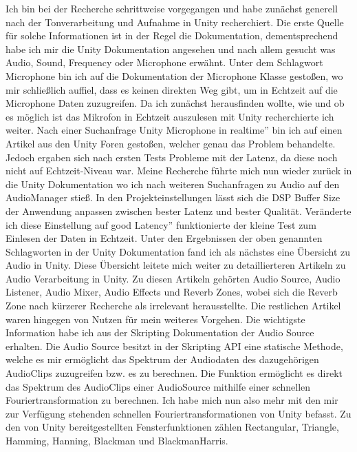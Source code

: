 Ich bin bei der Recherche schrittweise vorgegangen und habe zunächst generell nach der Tonverarbeitung und Aufnahme in Unity recherchiert. Die erste Quelle für solche Informationen ist in der Regel die Dokumentation, dementsprechend habe ich mir die Unity Dokumentation angesehen und nach allem gesucht was Audio, Sound, Frequency oder Microphone erwähnt. Unter dem Schlagwort Microphone bin ich auf die Dokumentation der Microphone Klasse gestoßen, wo mir schließlich auffiel, dass es keinen direkten Weg gibt, um in Echtzeit auf die Microphone Daten zuzugreifen. \cite{unity_doku_micro} Da ich zunächst herausfinden wollte, wie und ob es möglich ist das Mikrofon in Echtzeit auszulesen mit Unity recherchierte ich weiter. Nach einer Suchanfrage \glqq Unity Microphone in realtime'' bin ich auf einen Artikel aus den Unity Foren gestoßen, welcher genau das Problem behandelte. \cite{unity_forum_realtime} Jedoch ergaben sich nach ersten Tests Probleme mit der Latenz, da diese noch nicht auf Echtzeit-Niveau war. Meine Recherche führte mich nun wieder zurück in die Unity Dokumentation wo ich nach weiteren Suchanfragen zu Audio auf den AudioManager stieß. In den Projekteinstellungen lässt sich die DSP Buffer Size der Anwendung anpassen zwischen bester Latenz und bester Qualität. \cite{unity_doku_audioManager} Veränderte ich diese Einstellung auf \glqq good Latency'' funktionierte der kleine Test zum Einlesen der Daten in Echtzeit. Unter den Ergebnissen der oben genannten Schlagworten in der Unity Dokumentation fand ich als nächstes eine Übersicht zu Audio in Unity. \cite{unity_doku_audio} Diese Übersicht leitete mich weiter zu detaillierteren Artikeln zu Audio Verarbeitung in Unity. Zu diesen Artikeln gehörten Audio Source, Audio Listener, Audio Mixer, Audio Effects und Reverb Zones, wobei sich die Reverb Zone nach kürzerer Recherche als irrelevant herausstellte. Die restlichen Artikel waren hingegen von Nutzen für mein weiteres Vorgehen. Die wichtigste Information habe ich aus der Skripting Dokumentation der Audio Source erhalten. Die Audio Source besitzt in der Skripting API eine statische Methode, welche es mir ermöglicht das Spektrum der Audiodaten des dazugehörigen AudioClips zuzugreifen bzw. es zu berechnen. \cite{unity_doku_spectrumData}
Die Funktion ermöglicht es direkt das Spektrum des AudioClips einer AudioSource mithilfe einer schnellen Fouriertransformation zu berechnen. Ich habe mich nun also mehr mit den mir zur Verfügung stehenden schnellen Fouriertransformationen von Unity befasst. Zu den von Unity bereitgestellten Fensterfunktionen zählen Rectangular, Triangle, Hamming, Hanning, Blackman und BlackmanHarris. 
